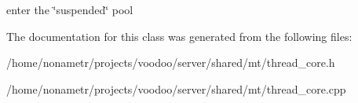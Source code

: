 enter the \char`\"{}suspended\char`\"{} pool 

\-The documentation for this class was generated from the following files\-:\begin{DoxyCompactItemize}
\item 
/home/nonametr/projects/voodoo/server/shared/mt/thread\-\_\-core.\-h\item 
/home/nonametr/projects/voodoo/server/shared/mt/thread\-\_\-core.\-cpp\end{DoxyCompactItemize}
